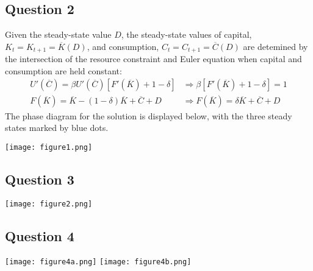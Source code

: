 \documentclass{article}
\begin{document}
\subsection*{Question 2}
Given the steady-state value $D$, the steady-state values of capital, ${K_t=K_{t+1}=\overline{K}(D)}$, and consumption, ${C_t=C_{t+1}=\overline{C}(D)}$ are detemined by the intersection of the resource constraint and Euler equation when capital and consumption are held constant:
\begin{align*}
	U'(\overline{C}) = \beta U'(\overline{C})\left[F'(\overline{K})+1-\delta\right] 
		&\Rightarrow \beta\left[F'(\overline{K})+1-\delta\right] = 1	\\
	F(\overline{K}) = \overline{K} - (1-\delta)\overline{K} + \overline{C} + D
		&\Rightarrow F(\overline{K}) = \delta\overline{K} + \overline{C} + D
\end{align*}
The phase diagram for the solution is displayed below, with the three steady states marked by blue dots.
\begin{center}
	\texttt{[image: figure1.png]}
\end{center}


\subsection*{Question 3}

\begin{center}
	\texttt{[image: figure2.png]}
\end{center}


\subsection*{Question 4}

\begin{center}
	\texttt{[image: figure4a.png]} \texttt{[image: figure4b.png]}
\end{center}

\end{document}
